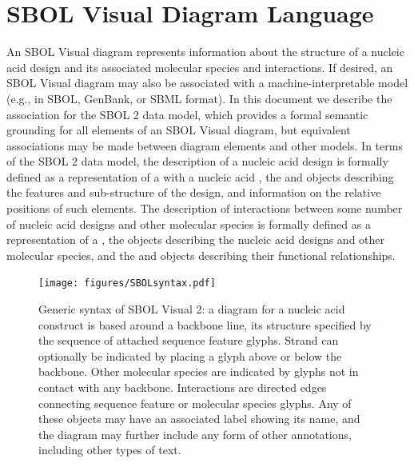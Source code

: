 \section{SBOL Visual Diagram Language}
\label{sec:language}

An SBOL Visual diagram represents information about the structure of a nucleic acid design and its associated molecular species and interactions.
%
If desired, an SBOL Visual diagram may also be associated with a machine-interpretable model (e.g., in SBOL, GenBank, or SBML format).
In this document we describe the association for the SBOL 2 data model, which provides a formal semantic grounding for all elements of an SBOL Visual diagram, but equivalent associations may be made between diagram elements and other models.
%
In terms of the SBOL 2 data model, the description of a nucleic acid design is formally defined as a representation of a  with a nucleic acid , the  and  objects describing the features and sub-structure of the design, and  information on the relative positions of such elements.
%
The description of interactions between some number of nucleic acid designs and other molecular species is formally defined as a representation of a , the  objects describing the nucleic acid designs and other molecular species, and the  and  objects describing their functional relationships.

\begin{figure}[h!]
\centering
\texttt{[image: figures/SBOLsyntax.pdf]}
\caption{Generic syntax of SBOL Visual 2:  
a diagram for a nucleic acid construct is based around a backbone line, its structure specified by the sequence of attached sequence feature glyphs.  
Strand can optionally be indicated by placing a glyph above or below the backbone.  
Other molecular species are indicated by glyphs not in contact with any backbone.
Interactions are directed edges connecting sequence feature or molecular species glyphs.
Any of these objects may have an associated label showing its name, and the diagram may further include any form of other annotations, including other types of text.}
\label{f:syntax}
\end{figure}

